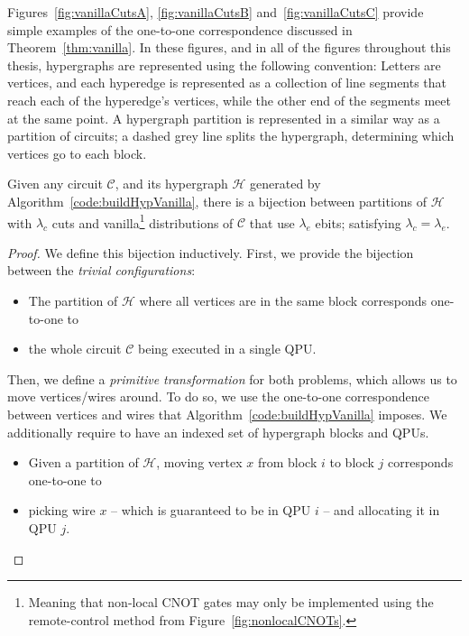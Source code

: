 Figures~\ref{fig:vanillaCutsA}, \ref{fig:vanillaCutsB} and~\ref{fig:vanillaCutsC} provide simple examples of the one-to-one correspondence discussed in Theorem~\ref{thm:vanilla}. In these figures, and in all of the figures throughout this thesis, hypergraphs are represented using the following convention: Letters are vertices, and each hyperedge is represented as a collection of line segments that reach each of the hyperedge's vertices, while the other end of the segments meet at the same point. A hypergraph partition is represented in a similar way as a partition of circuits; a dashed grey line splits the hypergraph, determining which vertices go to each block.



\begin{theorem} Given any circuit \(\mathcal{C}\), and its hypergraph \(\mathcal{H}\) generated by Algorithm~\ref{code:buildHypVanilla}, there is a bijection between partitions of \(\mathcal{H}\) with \(\lambda_c\) cuts and vanilla\footnote{Meaning that non-local CNOT gates may only be implemented using the remote-control method from Figure~\ref{fig:nonlocalCNOTs}.} distributions of \(\mathcal{C}\) that use \(\lambda_e\) ebits; satisfying \(\lambda_c = \lambda_e\).
\label{thm:vanilla}
\end{theorem} \begin{proof}
We define this bijection inductively. First, we provide the bijection between the \textit{trivial configurations}:
\begin{itemize}
  \item The partition of \(\mathcal{H}\) where all vertices are in the same block corresponds one-to-one to 
  \item the whole circuit \(\mathcal{C}\) being executed in a single QPU.
\end{itemize}

Then, we define a \textit{primitive transformation} for both problems, which allows us to move vertices/wires around. To do so, we use the one-to-one correspondence between vertices and wires that Algorithm~\ref{code:buildHypVanilla} imposes. We additionally require to have an indexed set of hypergraph blocks and QPUs.
\begin{itemize}
  \item Given a partition of \(\mathcal{H}\), moving vertex \(x\) from block \(i\) to block \(j\) corresponds one-to-one to
  \item picking wire \(x\) -- which is guaranteed to be in QPU \(i\) -- and allocating it in QPU \(j\).
\end{itemize}


\end{proof}
